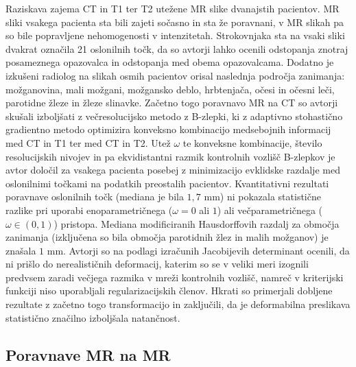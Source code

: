 \documentclass[journal]{IEEEtran}
\begin{document}
Raziskava \cite{fortunati2014} zajema CT in T1 ter T2 utežene MR slike dvanajstih pacientov. MR sliki vsakega pacienta sta bili zajeti sočasno in sta že poravnani, v MR slikah pa so bile popravljene nehomogenosti v intenzitetah. Strokovnjaka sta na vsaki sliki dvakrat označila 21 oslonilnih točk, da so avtorji lahko ocenili odstopanja znotraj posameznega opazovalca in odstopanja med obema opazovalcama. Dodatno je izkušeni radiolog na slikah osmih pacientov orisal naslednja področja zanimanja: možganovina, mali možgani, možgansko deblo, hrbtenjača, očesi in očesni leči, parotidne žleze in žleze slinavke. Začetno togo poravnavo MR na CT so avtorji skušali izboljšati z večresolucijsko metodo z B-zlepki, ki z adaptivno stohastično gradientno metodo optimizira konveksno kombinacijo medsebojnih informacij med CT in T1 ter med CT in T2. Utež $\omega$ te konveksne kombinacije, število resolucijskih nivojev in pa ekvidistantni razmik kontrolnih vozlišč B-zlepkov je avtor določil za vsakega pacienta posebej z minimizacijo evklidske razdalje med oslonilnimi točkami na podatkih preostalih pacientov. Kvantitativni rezultati poravnave oslonilnih točk (mediana je bila $1{,}7$ mm) ni pokazala statistične razlike pri uporabi enoparametričnega ($\omega = 0$ ali $1$) ali večparametričnega ($\omega\in(0,1)$) pristopa. Mediana modificiranih Hausdorffovih razdalj za območja zanimanja (izključena so bila območja parotidnih žlez in malih možganov) je znašala $1$ mm. Avtorji so na podlagi izračunih Jacobijevih determinant ocenili, da ni prišlo do nerealističnih deformacij, katerim so se v veliki meri izognili predvsem zaradi večjega razmika v mreži kontrolnih vozlišč, namreč v kriterijski funkciji niso uporabljali regularizacijskih členov. Hkrati so primerjali dobljene rezultate z začetno togo transformacijo in zaključili, da je deformabilna preslikava statistično značilno izboljšala natančnost.

\subsection{Poravnave MR na MR}
\end{document}
